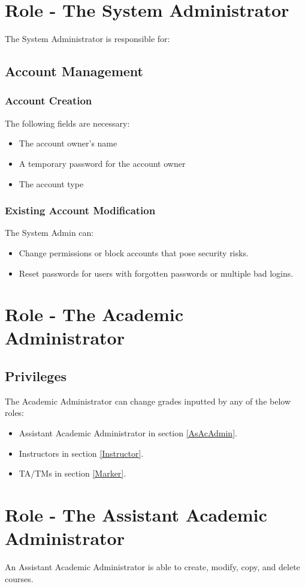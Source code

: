 \documentclass{article}
\begin{document}
\section{Role - The System Administrator \label{SysAdmin}}
The System Administrator is responsible for:
\subsection{Account Management}
\subsubsection{Account Creation \label{Account Creation}}
The following fields are necessary:
\begin{itemize}
  \item The account owner's name
  \item A temporary password for the account owner
  \item The account type
\end{itemize}
\subsubsection{Existing Account Modification}
The System Admin can:
\begin{itemize}
  \item Change permissions or block accounts that pose security risks.
  \item Reset passwords for users with forgotten passwords or multiple bad logins.
\end{itemize}

\section{Role - The Academic Administrator \label{AcAdmin}}
\subsection{Privileges}
The Academic Administrator can change grades inputted by any of the below roles:
\begin{itemize}
  \item Assistant Academic Administrator in section \ref{AsAcAdmin}.
  \item Instructors  in section \ref{Instructor}.
  \item TA/TMs in section \ref{Marker}.
\end{itemize}

\section{Role - The Assistant Academic Administrator \label{AsAcAdmin}}
An Assistant Academic Administrator is able to create, modify, copy, and delete courses.
\end{document}
